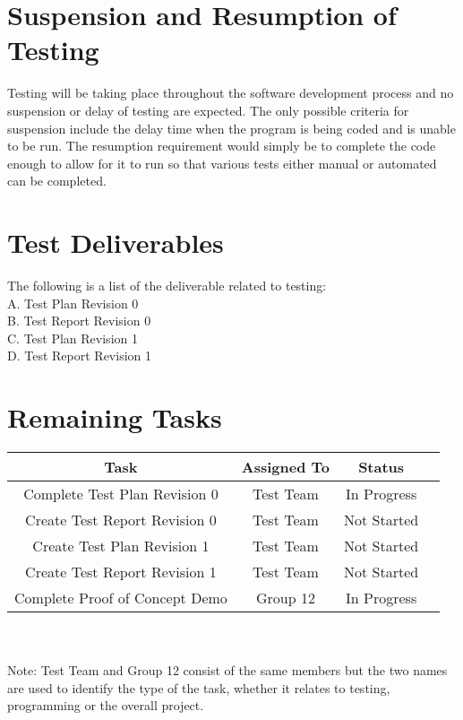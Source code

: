 \documentclass[12pt, letterpaper]{article}
\begin{document}
	\section{Suspension and Resumption of Testing}
	\indent \indent Testing will be taking place throughout the software development process and no suspension or delay of testing are expected. The only possible criteria for suspension include the delay time when the program is being coded and is unable to be run. The resumption requirement would simply be to complete the code enough to allow for it to run so that various tests either manual or automated can be completed.
	
	\section{Test Deliverables}
	The following is a list of the deliverable related to testing:\\
	\noindent A. \indent Test Plan Revision 0\\
	\noindent B. \indent Test Report Revision 0\\
	\noindent C. \indent Test Plan Revision 1\\
	\noindent D. \indent Test Report Revision 1
	
	\section{Remaining Tasks}

		\begin{tabular}{ |c|c|c|c| } 
			\hline
			\textbf{Task} & \textbf{Assigned To} & \textbf{Status}\\
			\hline
			Complete Test Plan Revision 0 & Test Team & In Progress\\
			\hline
			Create Test Report Revision 0 & Test Team & Not Started\\
			\hline
			Create Test Plan Revision 1 & Test Team & Not Started\\
			\hline
			Create Test Report Revision 1 & Test Team & Not Started\\
			\hline
			Complete Proof of Concept Demo & Group 12 & In Progress\\
			\hline
		\end{tabular}\\\\
		
		\noindent Note: Test Team and Group 12 consist of the same members but  the two names are used to identify the type of the task, whether it relates to testing, programming or the overall project.
	
\end{document}
